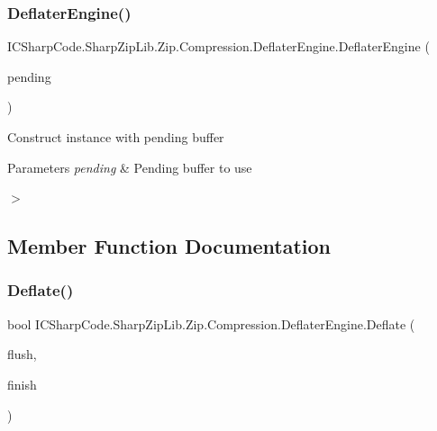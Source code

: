 \subsubsection{\texorpdfstring{Deflater\+Engine()}{DeflaterEngine()}\hspace{0.1cm}{\footnotesize\ttfamily [2/2]}}
{\footnotesize\ttfamily I\+C\+Sharp\+Code.\+Sharp\+Zip\+Lib.\+Zip.\+Compression.\+Deflater\+Engine.\+Deflater\+Engine (\begin{DoxyParamCaption}\item[{\hyperlink{class_i_c_sharp_code_1_1_sharp_zip_lib_1_1_zip_1_1_compression_1_1_deflater_pending}{Deflater\+Pending}}]{pending }\end{DoxyParamCaption})\hspace{0.3cm}{\ttfamily [inline]}}



Construct instance with pending buffer 


\begin{DoxyParams}{Parameters}
{\em pending} & Pending buffer to use \\
\hline
\end{DoxyParams}
$>$ 

\subsection{Member Function Documentation}
\mbox{\label{class_i_c_sharp_code_1_1_sharp_zip_lib_1_1_zip_1_1_compression_1_1_deflater_engine_a7f0e92fbf6e49d5fc251993e13b08d20}} 
\subsubsection{\texorpdfstring{Deflate()}{Deflate()}\hspace{0.1cm}{\footnotesize\ttfamily [1/2]}}
{\footnotesize\ttfamily bool I\+C\+Sharp\+Code.\+Sharp\+Zip\+Lib.\+Zip.\+Compression.\+Deflater\+Engine.\+Deflate (\begin{DoxyParamCaption}\item[{bool}]{flush,  }\item[{bool}]{finish }\end{DoxyParamCaption})\hspace{0.3cm}{\ttfamily [inline]}}




